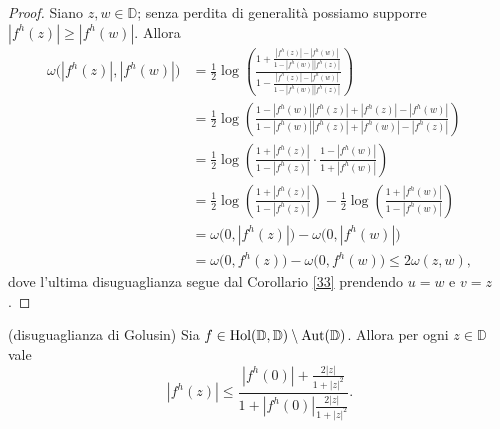 \begin{proof}
  Siano $z, w \in \mathbb{D}$; senza perdita di generalità possiamo supporre $|f^h(z)| \ge |f^h(w)|$. Allora
  \begin{align*}
    \omega\bigl(|f^h(z)|, |f^h(w)|\bigr) & =\frac{1}{2}\log\left(\frac{1+\frac{|f^h(z)|-|f^h(w)|}{1-|f^h(w)||f^h(z)|}}{1-\frac{|f^h(z)|-|f^h(w)|}{1-|f^h(w)||f^h(z)|}}\right) \\
    & =\frac{1}{2}\log\left(\frac{1-|f^h(w)||f^h(z)|+|f^h(z)|-|f^h(w)|}{1-|f^h(w)||f^h(z)|+|f^h(w)|-|f^h(z)|}\right) \\
    & =\frac{1}{2}\log\left(\frac{1+|f^h(z)|}{1-|f^h(z)|}\cdot\frac{1-|f^h(w)|}{1+|f^h(w)|}\right) \\
    & =\frac{1}{2}\log\left(\frac{1+|f^h(z)|}{1-|f^h(z)|}\right)-\frac{1}{2}\log\left(\frac{1+|f^h(w)|}{1-|f^h(w)|}\right) \\
    & =\omega\bigl(0,|f^h(z)|\bigr)-\omega\bigl(0,|f^h(w)|\bigr) \\
    & =\omega\bigl(0,f^h(z)\bigr)-\omega\bigl(0,f^h(w)\bigr) \le 2\omega(z,w),
  \end{align*}
  dove l'ultima disuguaglianza segue dal Corollario \ref{33} prendendo $u=w$ e $v=z$.
\end{proof}

\begin{thm} \label{golusin}
  (disuguaglianza di Golusin) Sia $f \in \text{\normalfont{Hol}}(\mathbb{D},\mathbb{D})\setminus\text{\normalfont{Aut}}(\mathbb{D})$. Allora per ogni $z \in \mathbb{D}$ vale
  \begin{equation} \label{gol}
    |f^h(z)| \le \frac{|f^h(0)|+\frac{2|z|}{1+|z|^2}}{1+|f^h(0)|\frac{2|z|}{1+|z|^2}}.
  \end{equation}
\end{thm}

